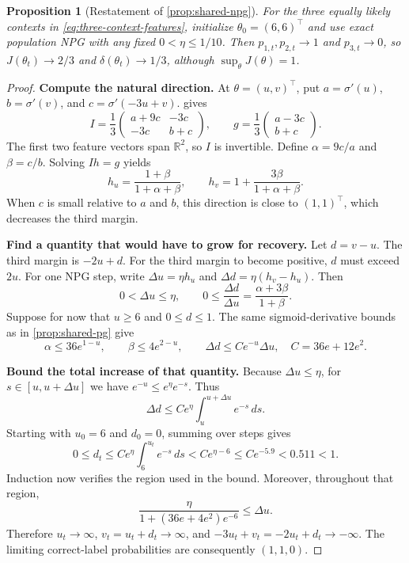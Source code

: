 \documentclass[11pt,twoside]{article}
\newcommand{\R}{\mathbb R}
\newtheorem{proposition}[theorem]{Proposition}
\theoremstyle{definition}
\theoremstyle{remark}
\begin{document}
\begin{proposition}[Restatement of \cref{prop:shared-npg}]
For the three equally likely contexts in \cref{eq:three-context-features},
initialize $\theta_0=(6,6)^\top$ and use exact population NPG with any
fixed $0<\eta\le1/10$. Then $p_{1,t},p_{2,t}\to1$ and $p_{3,t}\to0$,
so $J(\theta_t)\to2/3$ and $\delta(\theta_t)\to1/3$, although
$\sup_\theta J(\theta)=1$.
\end{proposition}
\begin{proof}
\textbf{Compute the natural direction.}
At $\theta=(u,v)^\top$, put
$a=\sigma'(u)$, $b=\sigma'(v)$, and $c=\sigma'(-3u+v)$.
 gives
\[
 I=\frac13\begin{pmatrix}a+9c&-3c\\-3c&b+c\end{pmatrix},
 \qquad g=\frac13\begin{pmatrix}a-3c\\b+c\end{pmatrix}.
\]
The first two feature vectors span $\R^2$, so $I$ is invertible.
Define $\alpha=9c/a$ and $\beta=c/b$. Solving $Ih=g$ yields
\[
 h_u=\frac{1+\beta}{1+\alpha+\beta},
 \qquad h_v=1+\frac{3\beta}{1+\alpha+\beta}.
\]
When $c$ is small relative to $a$ and $b$, this direction is close to
$(1,1)^\top$, which decreases the third margin.

\textbf{Find a quantity that would have to grow for recovery.}
Let $d=v-u$. The third margin is $-2u+d$.
For the third margin to become positive, $d$ must exceed $2u$.
For one NPG step, write $\Delta u=\eta h_u$ and
$\Delta d=\eta(h_v-h_u)$. Then
\[
 0<\Delta u\le\eta,
 \qquad
 0\le\frac{\Delta d}{\Delta u}
 =\frac{\alpha+3\beta}{1+\beta}.
\]
Suppose for now that $u\ge6$ and $0\le d\le1$. The same
sigmoid-derivative bounds as in \cref{prop:shared-pg} give
\[
 \alpha\le36e^{1-u},\qquad \beta\le4e^{2-u},
 \qquad \Delta d\le C e^{-u}\Delta u,
 \quad C=36e+12e^2.
\]

\textbf{Bound the total increase of that quantity.}
Because $\Delta u\le\eta$, for $s\in[u,u+\Delta u]$ we have
$e^{-u}\le e^\eta e^{-s}$. Thus
\[
 \Delta d\le C e^\eta\int_u^{u+\Delta u}e^{-s}\,ds.
\]
Starting with $u_0=6$ and $d_0=0$, summing over steps gives
\[
 0\le d_t\le C e^\eta\int_6^{u_t}e^{-s}\,ds
 <C e^{\eta-6}\le C e^{-5.9}<0.511<1.
\]
Induction now verifies the region used in the bound. Moreover, throughout
that region,
\[
 \frac{\eta}{1+(36e+4e^2)e^{-6}}\le\Delta u.
\]
Therefore $u_t\to\infty$, $v_t=u_t+d_t\to\infty$, and
$-3u_t+v_t=-2u_t+d_t\to-\infty$.
The limiting correct-label probabilities are consequently $(1,1,0)$.
\end{proof}
\end{document}
